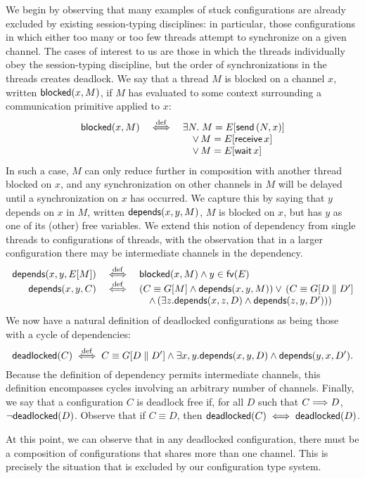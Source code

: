 \documentclass[oribibl,orivec,envcountsame]{llncs}
\begin{document}
We begin by observing that many examples of stuck configurations are already excluded by existing
session-typing disciplines: in particular, those configurations in which either too many or too few
threads attempt to synchronize on a given channel.  The cases of interest to us are those in which
the threads individually obey the session-typing discipline, but the order of synchronizations in
the threads creates deadlock.  We say that a thread $M$ is blocked on a channel $x$, written
$\mathsf{blocked}(x,M)$, if $M$ has evaluated to some context surrounding a communication primitive applied
to $x$:
%
\[\begin{array}{rcl}
  \mathsf{blocked}(x,M) &\stackrel{\mathrm{def}}{\iff}& \exists N. \; M = E[\mathsf{send} \, (N,x)] \\
  && \quad \lor \, M = E[\mathsf{receive} \, x] \\
  && \quad \lor \, M = E[\mathsf{wait} \, x]
\end{array}\]
%
In such a case, $M$ can only reduce further in composition with another thread blocked on $x$, and
any synchronization on other channels in $M$ will be delayed until a synchronization on $x$ has
occurred.  We capture this by saying that $y$ depends on $x$ in $M$, written $\mathsf{depends}(x,y,M)$, $M$ is
blocked on $x$, but has $y$ as one of its (other) free variables.  We extend this notion of
dependency from single threads to configurations of threads, with the observation that in a larger
configuration there may be intermediate channels in the dependency.
\[\begin{array}{rcl}
  \mathsf{depends}(x,y,E[M]) &\stackrel{\mathrm{def}}{\iff}& \mathsf{blocked}(x,M) \land y \in \mathsf{fv}(E) \\
  \mathsf{depends}(x,y,C) &\stackrel{\mathrm{def}}{\iff}& (C \equiv G[M] \land \mathsf{depends}(x,y,M)) \lor \, (C \equiv G[D \parallel D'] \\
  && \quad \land \, (\exists z. \mathsf{depends}(x,z,D) \land \mathsf{depends}(z,y,D')))
\end{array}\]
%
We now have a natural definition of deadlocked configurations as being those with a cycle of
dependencies:
%
\[
\mathsf{deadlocked}(C) \stackrel{\mathrm{def}}{\iff} C \equiv G[D \parallel D'] \land \exists x,y. \mathsf{depends}(x,y,D) \land \mathsf{depends}(y,x,D').
\]
%
Because the definition of dependency permits intermediate channels, this definition encompasses
cycles involving an arbitrary number of channels.  Finally, we say that a configuration $C$ is
deadlock free if, for all $D$ such that $C \Longrightarrow D$, $\lnot\mathsf{deadlocked}(D)$.  Observe that if
$C \equiv D$, then $\mathsf{deadlocked}(C) \iff \mathsf{deadlocked}(D)$.

At this point, we can observe that in any deadlocked configuration, there must be a composition of
configurations that shares more than one channel.  This is precisely the situation that is excluded
by our configuration type system.
\end{document}
